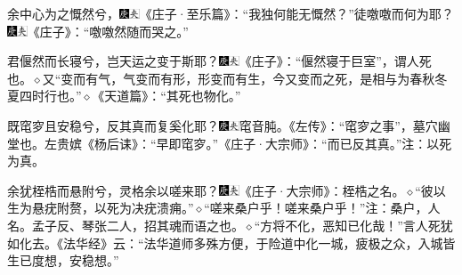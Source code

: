 余中心为之慨然兮，{\includegraphics[width=3mm]{../Images/00004}\includegraphics[width=3mm]{../Images/00012}\footnotesize \kaishu 《庄子·至乐篇》：“我独何能无慨然？”}徒噭噭而何为耶？{{\includegraphics[width=3mm]{../Images/00004}\includegraphics[width=3mm]{../Images/00012}\footnotesize \kaishu 《庄子》：“噭噭然随而哭之。”}}

君偃然而长寝兮，岂天运之变于斯耶？{\includegraphics[width=3mm]{../Images/00004}\includegraphics[width=3mm]{../Images/00012}\footnotesize \kaishu 《庄子》：“偃然寝于巨室”，谓人死也。{$\diamond$}又“变而有气，气变而有形，形变而有生，今又变而之死，是相与为春秋冬夏四时行也。”{$\diamond$}《天道篇》：“其死也物化。”}

既窀穸且安稳兮，反其真而复奚化耶？{\includegraphics[width=3mm]{../Images/00004}\includegraphics[width=3mm]{../Images/00012}\footnotesize \kaishu 窀音肫。《左传》：“窀穸之事”，墓穴幽堂也。左贵嫔《杨后诔》：“早即窀穸。”《庄子·大宗师》：“而已反其真。”注：以死为真。}

余犹桎梏而悬附兮，灵格余以嗟来耶？{\includegraphics[width=3mm]{../Images/00004}\includegraphics[width=3mm]{../Images/00012}\footnotesize \kaishu 《庄子·大宗师》：桎梏之名。{$\diamond$}“彼以生为悬疣附赘，以死为决疣溃痈。”{$\diamond$}“嗟来桑户乎！嗟来桑户乎！”注：桑户，人名。孟子反、琴张二人，招其魂而语之也。{$\diamond$}“方将不化，恶知已化哉！”言人死犹如化去。《法华经》云：“法华道师多殊方便，于险道中化一城，疲极之众，入城皆生已度想，安稳想。”}

